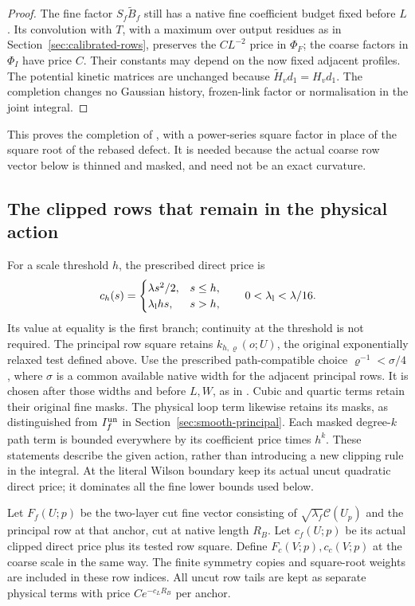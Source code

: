 \documentclass[11pt,reqno]{amsart}
\numberwithin{equation}{section}
\theoremstyle{definition}
\theoremstyle{remark}
\begin{document}
\begin{proof}
The fine factor \(S_f\widetilde B_f\) still has a native
fine coefficient budget fixed before \(L\). Its convolution
with \(T\), with a maximum over output residues as in
Section~\ref{sec:calibrated-rows}, preserves the \(CL^{-2}\)
price in \(\Phi_F\); the coarse factors in \(\Phi_I\)
have price \(C\). Their constants may depend on the now
fixed adjacent profiles. The potential kinetic matrices
are unchanged because \(\widetilde H_vd_1=H_vd_1\).
The completion changes no Gaussian history, frozen-link
factor or normalisation in the joint integral.
\end{proof}

This proves the completion of \cite[Lemma~30.4, pp.~170--173]{Main},
with a power-series square factor in place of the square root
of the rebased defect.
It is needed because the actual coarse row vector below is
thinned and masked, and need not be an exact curvature.

\subsection{The clipped rows that remain in the physical action}

For a scale threshold \(h\), the prescribed direct price is
\[
 c_h(s)=\begin{cases}\lambda s^2/2,&s\le h,\\
                         \lambda_{\rm l}hs,&s>h,
          \end{cases}
 \qquad 0<\lambda_{\rm l}<\lambda/16.
\]
Its value at equality is the first branch; continuity at the
threshold is not required. The principal row square retains
\(k_{h,\varrho}(o;U)\), the original exponentially relaxed test
defined above. Use the prescribed path-compatible choice
\(\varrho^{-1}<\sigma/4\), where \(\sigma\) is a common
available native width for the adjacent principal rows.
It is chosen after those widths and before \(L,W\), as in
\cite[Lemma~13.10, pp.~52--53]{Main}.
Cubic and quartic terms retain their original
fine masks. The physical loop term likewise retains its masks,
as distinguished from \(I_f^{\rm un}\) in
Section~\ref{sec:smooth-principal}. Each masked degree-\(k\)
path term is bounded everywhere by its coefficient price times
\(h^k\). These statements describe the given action, rather
than introducing a new clipping rule in the integral.
At the literal Wilson boundary keep its actual uncut quadratic
direct price; it dominates all the fine lower bounds used below.

Let \(F_f(U;p)\) be the two-layer cut fine vector consisting of
\(\sqrt{\lambda_f}\mathcal C(U_p)\) and the principal row at
that anchor, cut at native length \(R_B\). Let \(c_f(U;p)\)
be its actual clipped direct price plus its tested row square.
Define \(F_c(V;p),c_c(V;p)\) at the coarse scale in the same
way. The finite symmetry copies and square-root weights are
included in these row indices. All uncut row tails are kept as
separate physical terms with price \(Ce^{-c_LR_B}\) per anchor.
\end{document}

